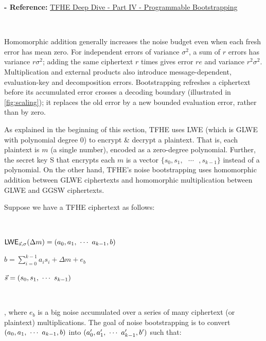\textbf{- Reference:} 
\href{https://www.zama.ai/post/tfhe-deep-dive-part-4}{TFHE Deep Dive - Part IV - Programmable Bootstrapping}~\cite{tfhe-4}

$ $

Homomorphic addition generally increases the noise budget even when each fresh error has mean zero. For independent errors of variance $\sigma^2$, a sum of $r$ errors has variance $r\sigma^2$; adding the same ciphertext $r$ times gives error $re$ and variance $r^2\sigma^2$. Multiplication and external products also introduce message-dependent, evaluation-key and decomposition errors. Bootstrapping refreshes a ciphertext before its accumulated error crosses a decoding boundary (illustrated in \autoref{fig:scaling}); it replaces the old error by a new bounded evaluation error, rather than by zero.

As explained in the beginning of this section, TFHE uses LWE (which is GLWE with polynomial degree 0) to encrypt \& decrypt a plaintext. That is, each plaintext is $m$ (a single number), encoded as a zero-degree polynomial. Further, the secret key S that encrypts each $m$ is a vector $ \{s_0, s_1, \text{ } \cdots \text{ }, s_{k-1} \}$ instead of a polynomial. On the other hand, TFHE's noise bootstrapping uses homomorphic addition between GLWE ciphertexts and homomorphic multiplication between GLWE and GGSW ciphertexts.  


Suppose we have a TFHE ciphertext as follows: 

$ $

$\textsf{LWE}_{\vec{s}, \sigma}(\Delta m) = (a_0, a_1, \text{ } \text{$\cdots$} \text{ } a_{k-1}, b)$

$b = \sum\limits_{i=0}^{k-1} a_is_i + \Delta m + e_b$

$\vec{s} = (s_0, s_1, \text{ } \text{$\cdots$} \text{ } s_{k-1})$

$ $

, where $e_b$ is a big noise accumulated over a series of many ciphertext (or plaintext) multiplications. The goal of noise bootstrapping is to convert $(a_0, a_1, \text{ } \text{$\cdots$} \text{ } a_{k-1}, b)$ into $(a_0', a_1', \text{ } \text{$\cdots$} \text{ } a_{k-1}', b')$ such that: 

